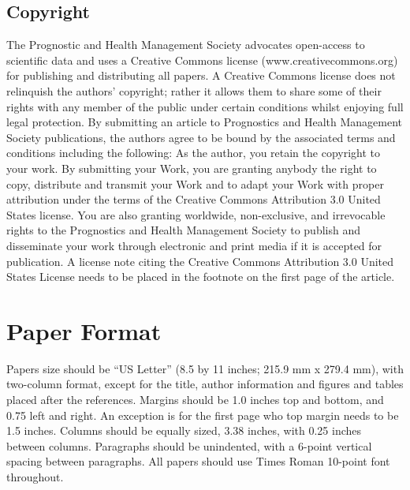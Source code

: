 \documentclass[IJPHM, 2014, 00]{PHMSociety}
\begin{document}
\subsection{Copyright}
The Prognostic and Health Management Society advocates open-access to scientific data and uses a Creative Commons license (www.creativecommons.org) for publishing and distributing all papers. A Creative Commons license does not relinquish the authors' copyright; rather it allows them to share some of their rights with any member of the public under certain conditions whilst enjoying full legal protection. By submitting an article to Prognostics and Health Management Society publications, the authors agree to be bound by the associated terms and conditions including the following:
As the author, you retain the copyright to your work. By submitting your Work, you are granting anybody the right to copy, distribute and transmit your Work and to adapt your Work with proper attribution under the terms of the Creative Commons Attribution 3.0 United States license. You are also granting worldwide, non-exclusive, and irrevocable rights to the Prognostics and Health Management Society to publish and disseminate your work through electronic and print media if it is accepted for publication. A license note citing the Creative Commons Attribution 3.0 United States License needs to be placed in the footnote on the first page of the article.




\section{Paper Format}
Papers size should be ``US Letter'' (8.5 by 11 inches; 215.9 mm x 279.4 mm), with two-column format, except for the title, author information and figures and tables placed after the references. Margins should be 1.0 inches top and bottom, and 0.75 left and right. An exception is for the first page who top margin needs to be 1.5 inches. Columns should be equally sized, 3.38 inches, with 0.25 inches between columns. Paragraphs should be unindented, with a 6-point vertical spacing between paragraphs. All papers should use Times Roman 10-point font throughout.
\end{document}
